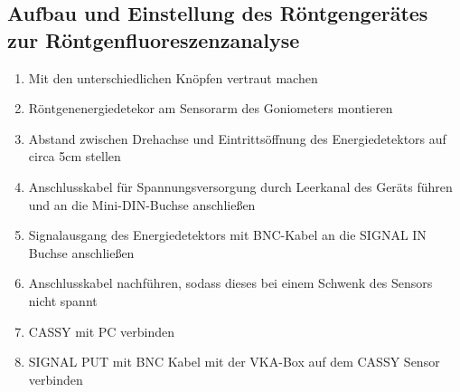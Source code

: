 \documentclass{article}
\begin{document}
\newpage

\subsection{Aufbau und Einstellung des Röntgengerätes zur Röntgenfluoreszenzanalyse}   
    \begin{enumerate}[label=\arabic*.]
        \item Mit den unterschiedlichen Knöpfen vertraut machen
        \item Röntgenenergiedetekor am Sensorarm des Goniometers montieren
        \item Abstand zwischen Drehachse und Eintrittsöffnung des Energiedetektors auf circa 5cm stellen
        \item Anschlusskabel für Spannungsversorgung durch Leerkanal des Geräts führen und an die Mini-DIN-Buchse anschließen
        \item Signalausgang des Energiedetektors mit BNC-Kabel an die SIGNAL IN Buchse anschließen
        \item Anschlusskabel nachführen, sodass dieses bei einem Schwenk des Sensors nicht spannt
        \item CASSY mit PC verbinden
        \item SIGNAL PUT mit BNC Kabel mit der VKA-Box auf dem CASSY Sensor verbinden
    \end{enumerate}

\newpage
\end{document}
